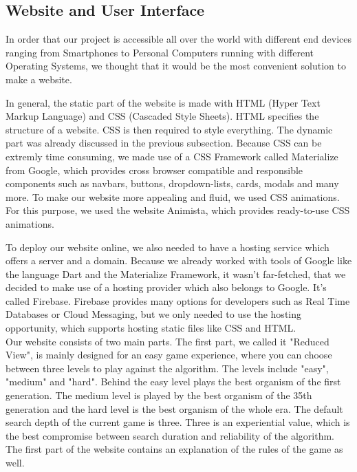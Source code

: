 \subsection{Website and User Interface}
In order that our project is accessible all over the world with different end devices ranging from Smartphones to Personal Computers running with different Operating Systems, we thought that it would be the most convenient solution to make a website. 

In general, the static part of the website is made with HTML (Hyper Text Markup Language) and CSS (Cascaded Style Sheets). HTML specifies the structure of a website.  CSS is then required to style everything. The dynamic part was already discussed in the previous subsection. 
Because CSS can be extremly time consuming, we made use of a CSS Framework called Materialize from Google, which provides cross browser compatible and responsible components such as navbars, buttons, dropdown-lists, cards, modals and many more. To make our website more appealing and fluid, we used CSS animations. For this purpose, we used the website Animista, which provides ready-to-use CSS animations.

To deploy our website online, we also needed to have a hosting service which offers a server and a domain. Because we already worked with tools of Google like the language Dart and the Materialize Framework, it wasn't far-fetched, that we decided to make use of a hosting provider which also belongs to Google. It's called Firebase. Firebase provides many options for developers such as Real Time Databases or Cloud Messaging, but we only needed to use the hosting opportunity, which supports hosting static files like CSS and HTML.\\

Our website consists of two main parts. The first part, we called it "Reduced View", is mainly designed for an easy game experience, where you can choose between three levels to play against the algorithm. The levels include "easy", "medium" and "hard". Behind the easy level plays the best organism of the first generation. 
The medium level is played by the best organism of the 35th %
generation and the hard level is the best organism of the whole era. The default search depth of the current game is three. Three is an experiential value, which is the best compromise between search duration and reliability of the algorithm.
The first part of the website contains an explanation of the rules of the game as well.

